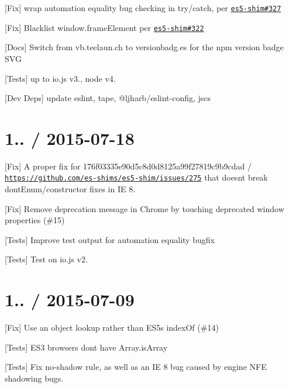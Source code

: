 \begin{DoxyItemize}
\item \mbox{[}Fix\mbox{]} wrap automation equality bug checking in try/catch, per \href{https://github.com/es-shims/es5-shim/issues/327}{\tt es5-\/shim\#327}
\item \mbox{[}Fix\mbox{]} Blacklist \textquotesingle{}window.\+frame\+Element\textquotesingle{} per \href{https://github.com/es-shims/es5-shim/issues/322}{\tt es5-\/shim\#322}
\item \mbox{[}Docs\mbox{]} Switch from vb.\+teelaun.\+ch to versionbadg.\+es for the npm version badge S\+VG
\item \mbox{[}Tests\mbox{]} up to {\ttfamily io.\+js} {\ttfamily v3.}, {\ttfamily node} {\ttfamily v4.}
\item \mbox{[}Dev Deps\mbox{]} update {\ttfamily eslint}, {\ttfamily tape}, {\ttfamily @ljharb/eslint-\/config}, {\ttfamily jscs}
\end{DoxyItemize}

\section*{1.. / 2015-\/07-\/18 }


\begin{DoxyItemize}
\item \mbox{[}Fix\mbox{]} A proper fix for 176f03335e90d5c8d0d8125a99f27819c9b9cdad / \href{https://github.com/es-shims/es5-shim/issues/275}{\tt https\+://github.\+com/es-\/shims/es5-\/shim/issues/275} that doesn\textquotesingle{}t break dont\+Enum/constructor fixes in IE 8.
\item \mbox{[}Fix\mbox{]} Remove deprecation message in Chrome by touching deprecated window properties (\#15)
\item \mbox{[}Tests\mbox{]} Improve test output for automation equality bugfix
\item \mbox{[}Tests\mbox{]} Test on {\ttfamily io.\+js} {\ttfamily v2.}
\end{DoxyItemize}

\section*{1.. / 2015-\/07-\/09 }


\begin{DoxyItemize}
\item \mbox{[}Fix\mbox{]} Use an object lookup rather than E\+S5\textquotesingle{}s {\ttfamily index\+Of} (\#14)
\item \mbox{[}Tests\mbox{]} E\+S3 browsers don\textquotesingle{}t have {\ttfamily Array.\+is\+Array}
\item \mbox{[}Tests\mbox{]} Fix {\ttfamily no-\/shadow} rule, as well as an IE 8 bug caused by engine N\+FE shadowing bugs.
\end{DoxyItemize}

